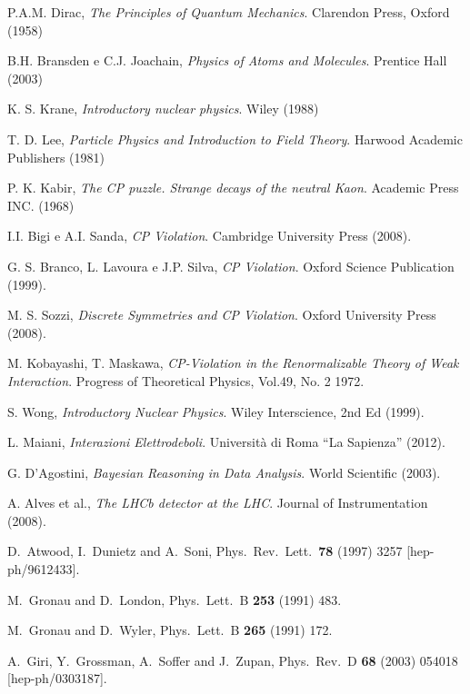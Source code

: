 \textbf{}\begin{thebibliography}{10}

\frenchspacing
{}
P.A.M. Dirac, \emph{The Principles of Quantum Mechanics}. Clarendon Press, Oxford (1958)

B.H. Bransden e C.J. Joachain, \emph{Physics of Atoms and Molecules}. Prentice Hall (2003)

K. S. Krane, \emph{Introductory nuclear physics}. Wiley (1988)

T. D. Lee, \emph{Particle Physics and Introduction to Field Theory}. Harwood Academic Publishers (1981)

P. K. Kabir, \emph{The CP puzzle. Strange decays of the neutral Kaon}. Academic Press INC. (1968)

I.I. Bigi e A.I. Sanda, \emph{CP Violation}. Cambridge University Press (2008).

G. S. Branco, L. Lavoura e J.P. Silva, \emph{CP Violation}. Oxford Science Publication (1999).

M. S. Sozzi, \emph{Discrete Symmetries and CP Violation}. Oxford University Press (2008).

M. Kobayashi, T. Maskawa, \emph{CP-Violation in the Renormalizable Theory of Weak Interaction}. Progress of Theoretical Physics, Vol.49, No. 2 1972.

S. Wong, \emph{Introductory Nuclear Physics}. Wiley Interscience, 2nd Ed (1999).

L. Maiani, \emph{Interazioni Elettrodeboli}. Università di Roma ``La Sapienza'' (2012).

G. D'Agostini, \emph{Bayesian Reasoning in Data Analysis}. World Scientific (2003).

A. Alves et al., \emph{The LHCb detector at the LHC}. Journal of Instrumentation (2008).

  D.~Atwood, I.~Dunietz and A.~Soni, Phys.\ Rev.\ Lett.\  {\bf 78} (1997) 3257
  [hep-ph/9612433].

  M.~Gronau and D.~London, Phys.\ Lett.\ B {\bf 253} (1991) 483.

  M.~Gronau and D.~Wyler,  Phys.\ Lett.\ B {\bf 265} (1991) 172.

  A.~Giri, Y.~Grossman, A.~Soffer and J.~Zupan,  Phys.\ Rev.\ D {\bf 68} (2003) 054018
  [hep-ph/0303187].


\end{thebibliography}
